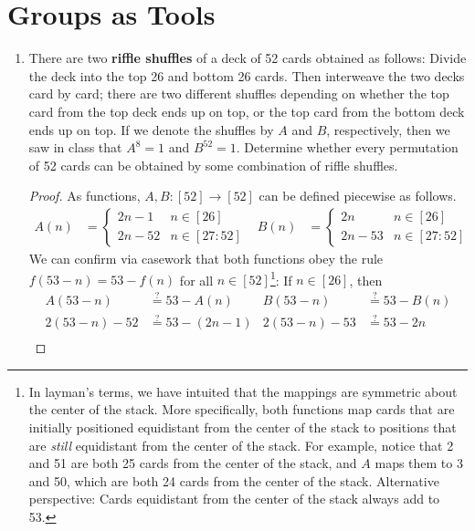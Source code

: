 \documentclass[../psets.tex]{subfiles}
\begin{document}
\section{Groups as Tools}
\begin{enumerate}
    \item {}There are two \textbf{riffle shuffles} of a deck of 52 cards obtained as follows: Divide the deck into the top 26 and bottom 26 cards. Then interweave the two decks card by card; there are two different shuffles depending on whether the top card from the top deck ends up on top, or the top card from the bottom deck ends up on top. If we denote the shuffles by $A$ and $B$, respectively, then we saw in class that $A^8=1$ and $B^{52}=1$. Determine whether every permutation of 52 cards can be obtained by some combination of riffle shuffles.
    \begin{proof}
        As functions, $A,B:[52]\to[52]$ can be defined piecewise as follows.
        \begin{align*}
            A(n) &=
            \begin{cases}
                2n-1 & n\in[26]\\
                2n-52 & n\in[27:52]
            \end{cases}&
            B(n) &=
            \begin{cases}
                2n & n\in[26]\\
                2n-53 & n\in[27:52]
            \end{cases}
        \end{align*}
        We can confirm via casework that both functions obey the rule $f(53-n)=53-f(n)$ for all $n\in[52]$\footnote{In layman's terms, we have intuited that the mappings are symmetric about the center of the stack. More specifically, both functions map cards that are initially positioned equidistant from the center of the stack to positions that are \emph{still} equidistant from the center of the stack. For example, notice that 2 and 51 are both 25 cards from the center of the stack, and $A$ maps them to 3 and 50, which are both 24 cards from the center of the stack. Alternative perspective: Cards equidistant from the center of the stack always add to 53.}: If $n\in[26]$, then
        \begin{align*}
            A(53-n) &\stackrel{?}{=} 53-A(n)&
                B(53-n) &\stackrel{?}{=} 53-B(n)\\
            2(53-n)-52 &\stackrel{?}{=} 53-(2n-1)&
                2(53-n)-53 &\stackrel{?}{=} 53-2n\\

\end{align*}
\end{proof}
\end{enumerate}
\end{document}
